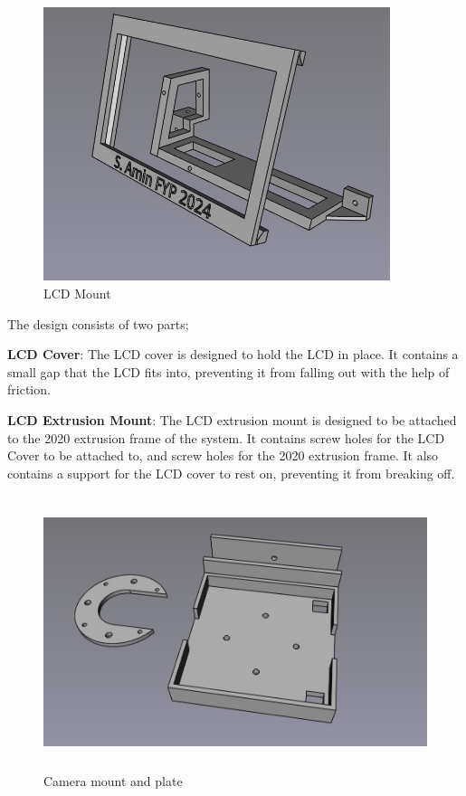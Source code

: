 \begin{figure}[H]
    \begin{minipage}[h]{0.95\textwidth}
        \centering
        \includegraphics[height=8cm]{imgs/freecad/lcd_mount2.jpg}
        \caption{LCD Mount}
        \label{fig:lcdmount}
    \end{minipage}
\end{figure}

The design consists of two parts;
\par
\textbf{LCD Cover}: The LCD cover is designed to hold the LCD in place. It contains a small gap that the LCD fits into, preventing it from falling out with the help of friction.
\par
\textbf{LCD Extrusion Mount}: The LCD extrusion mount is designed to be attached to the 2020 extrusion frame of the system. It contains screw holes for the LCD Cover to be attached to, and screw holes for the 2020 extrusion frame. It also contains a support for the LCD cover to rest on, preventing it from breaking off.


\begin{figure}[H]
    \begin{minipage}[h]{0.95\textwidth}
        \centering
        \includegraphics[height=8cm]{imgs/freecad/cameraplate.jpg}
        \caption{Camera mount and plate}
        \label{fig:cameraplate}
    \end{minipage}
\end{figure}

